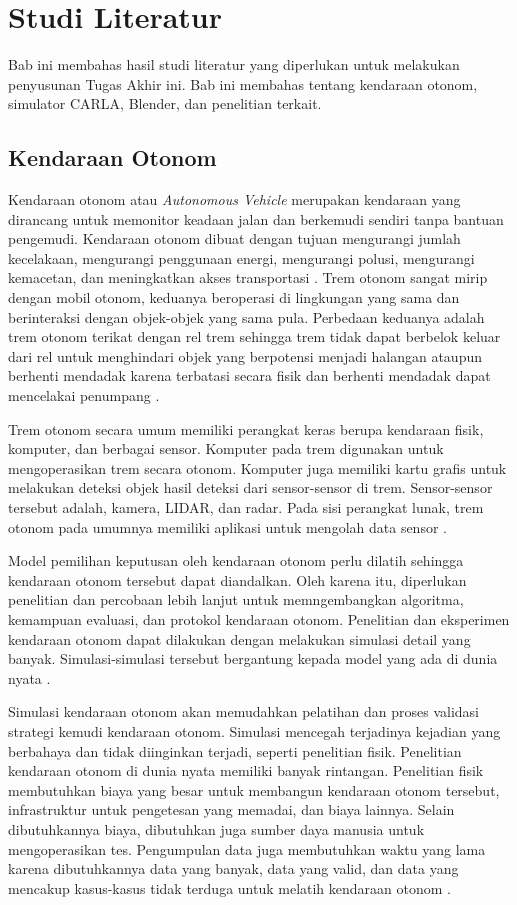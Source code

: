 \chapter{Studi Literatur}

Bab ini membahas hasil studi literatur yang diperlukan untuk melakukan
penyusunan Tugas Akhir ini. Bab ini membahas tentang kendaraan otonom, simulator
CARLA, Blender, dan penelitian terkait.

\section{Kendaraan Otonom}

Kendaraan otonom atau \textit{Autonomous Vehicle} merupakan kendaraan yang
dirancang untuk memonitor keadaan jalan dan berkemudi sendiri tanpa bantuan
pengemudi. Kendaraan otonom dibuat dengan tujuan mengurangi jumlah kecelakaan,
mengurangi penggunaan energi, mengurangi polusi, mengurangi kemacetan, dan
meningkatkan akses transportasi \parencite{av-bagloee}. Trem otonom sangat mirip
dengan mobil otonom, keduanya beroperasi di lingkungan yang sama dan
berinteraksi dengan objek-objek yang sama pula. Perbedaan keduanya adalah trem
otonom terikat dengan rel trem sehingga trem tidak dapat berbelok keluar dari
rel untuk menghindari objek yang berpotensi menjadi halangan ataupun berhenti
mendadak karena terbatasi secara fisik dan berhenti mendadak dapat mencelakai
penumpang \parencite{at-palmer}.

Trem otonom secara umum memiliki perangkat keras berupa kendaraan fisik,
komputer, dan berbagai sensor. Komputer pada trem digunakan untuk mengoperasikan
trem secara otonom. Komputer juga memiliki kartu grafis untuk melakukan deteksi
objek hasil deteksi dari sensor-sensor di trem. Sensor-sensor tersebut adalah,
kamera, LIDAR, dan radar. Pada sisi perangkat lunak, trem otonom pada
umumnya memiliki aplikasi untuk mengolah data sensor \parencite{at-palmer}.

Model pemilihan keputusan oleh kendaraan otonom perlu dilatih sehingga kendaraan
otonom tersebut dapat diandalkan. Oleh karena itu, diperlukan penelitian dan
percobaan lebih lanjut untuk memngembangkan algoritma, kemampuan evaluasi, dan
protokol kendaraan otonom. Penelitian dan eksperimen kendaraan otonom dapat
dilakukan dengan melakukan simulasi detail yang banyak. Simulasi-simulasi
tersebut bergantung kepada model yang ada di dunia nyata \parencite{av-berger}.

Simulasi kendaraan otonom akan memudahkan pelatihan dan proses validasi strategi
kemudi kendaraan otonom. Simulasi mencegah terjadinya kejadian yang berbahaya
dan tidak diinginkan terjadi, seperti penelitian fisik. Penelitian kendaraan
otonom di dunia nyata memiliki banyak rintangan. Penelitian fisik membutuhkan
biaya yang besar untuk membangun kendaraan otonom tersebut, infrastruktur untuk
pengetesan yang memadai, dan biaya lainnya. Selain dibutuhkannya biaya,
dibutuhkan juga sumber daya manusia untuk mengoperasikan tes. Pengumpulan data
juga membutuhkan waktu yang lama karena dibutuhkannya data yang banyak, data
yang valid, dan data yang mencakup kasus-kasus tidak terduga untuk melatih
kendaraan otonom \parencite{carla-dosovitskiy}.

